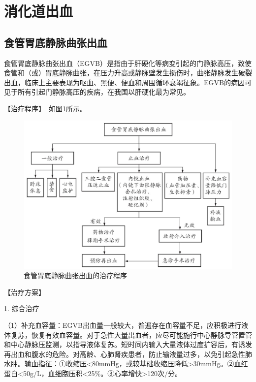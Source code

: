 \section{消化道出血}

\subsection{食管胃底静脉曲张出血}

食管胃底静脉曲张出血（EGVB）是指由于肝硬化等病变引起的门静脉高压，致使食管和（或）胃底静脉曲张，在压力升高或静脉壁发生损伤时，曲张静脉发生破裂出血，临床上主要表现为呕血、黑便、便血和周围循环衰竭征象。EGVB的病因可见于所有引起门静脉高压的疾病，在我国以肝硬化最为常见。

【治疗程序】　如图\ref{fig3-22-1}所示。

\begin{figure}[!htbp]
 \centering
 \includegraphics{./images/Image00115.jpg}
 \captionsetup{justification=centering}
 \caption{食管胃底静脉曲张出血的治疗程序}
 \label{fig3-22-1}
  \end{figure} 

【治疗方案】

1. 综合治疗

（1）补充血容量：EGVB出血量一般较大，普遍存在血容量不足，应积极进行液体复苏，恢复有效血容量。对于急性大量出血者，应尽可能施行中心静脉导管置管和中心静脉压监测，以指导液体复苏。短时间内输入大量液体过度扩容后，有诱发再出血和腹水的危险。对高龄、心肺肾疾患者，防止输液量过多，以免引起急性肺水肿。输血指征：①收缩压\textless{}80mmHg，或较基础收缩压降低\textgreater{}30mmHg。②血红蛋白\textless{}50g/L，血细胞压积\textless{}25\%。③心率增快\textgreater{}120次/分。

